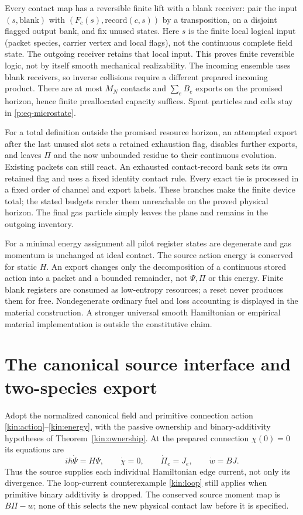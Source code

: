 \documentclass[11pt,oneside,openany]{book}
\theoremstyle{definition}
\theoremstyle{remark}\newtheorem{remark}[theorem]{Remark}
\begin{document}
Every contact map has a reversible finite lift with a blank receiver: pair the input $(s,\mathrm{blank})$ with $(F_c(s),\mathrm{record}(c,s))$ by a transposition, on a disjoint flagged output bank, and fix unused states. Here $s$ is the finite local logical input (packet species, carrier vertex and local flags), not the continuous complete field state. The outgoing receiver retains that local input. This proves finite reversible logic, not by itself smooth mechanical realizability. The incoming ensemble uses blank receivers, so inverse collisions require a different prepared incoming product. There are at most $M_N$ contacts and $\sum_e B_e$ exports on the promised horizon, hence finite preallocated capacity suffices. Spent particles and cells stay in \eqref{p:eq-microstate}.

For a total definition outside the promised resource horizon, an attempted export after the last unused slot sets a retained exhaustion flag, disables further exports, and leaves $\Pi$ and the now unbounded residue to their continuous evolution. Existing packets can still react. An exhausted contact-record bank sets its own retained flag and uses a fixed identity contact rule. Every exact tie is processed in a fixed order of channel and export labels. These branches make the finite device total; the stated budgets render them unreachable on the proved physical horizon. The final gas particle simply leaves the plane and remains in the outgoing inventory.

For a minimal energy assignment all pilot register states are degenerate and gas momentum is unchanged at ideal contact. The source action energy is conserved for static $H$. An export changes only the decomposition of a continuous stored action into a packet and a bounded remainder, not $\Psi,\Pi$ or this energy. Finite blank registers are consumed as low-entropy resources; a reset never produces them for free. Nondegenerate ordinary fuel and loss accounting is displayed in the material construction. A stronger universal smooth Hamiltonian or empirical material implementation is outside the constitutive claim.

\section{The canonical source interface and two-species export}
\label{p:sec-source}
Adopt the normalized canonical field and primitive connection action
\eqref{kin:action}--\eqref{kin:energy}, with the passive ownership and
binary-additivity hypotheses of Theorem~\ref{kin:ownership}.  At the
prepared connection $\chi(0)=0$ its equations are
\begin{equation}\label{p:eq-ownership}
 i\hbar\dot\Psi=H\Psi,\qquad \dot\chi=0,\qquad
 \dot\Pi_e=J_e,\qquad \dot w=BJ.
\end{equation}
Thus the source supplies each individual Hamiltonian edge current, not
only its divergence.  The loop-current counterexample
\ref{kin:loop} still applies when primitive binary additivity is dropped.
The conserved source moment map is $B\Pi-w$; none of this selects the
new physical contact law before it is specified.
\end{document}
